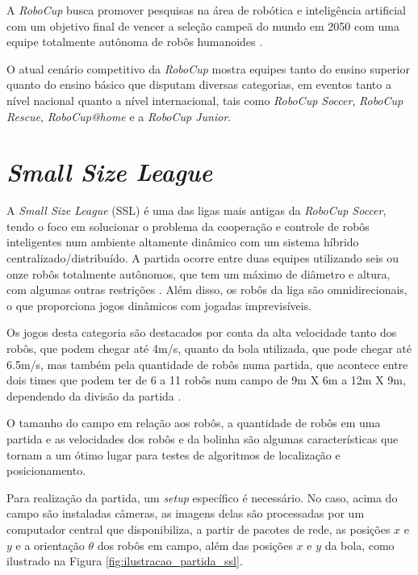 \documentclass[acronym, symbols, table]{fei}
\begin{document}
		A \textit{RoboCup} busca promover pesquisas na área de robótica e inteligência artificial com um objetivo final de vencer a seleção campeã do mundo em 2050 com uma equipe totalmente autônoma de robôs humanoides \cite{RoboCup}.
		
		O atual cenário competitivo da \textit{RoboCup} mostra equipes tanto do ensino superior quanto do ensino básico que disputam diversas categorias, em eventos tanto a nível nacional quanto a nível internacional, tais como \textit{RoboCup Soccer}, \textit{RoboCup Rescue}, \textit{RoboCup@home} e a \textit{RoboCup Junior}.
	
	\section{\textit{Small Size League}} \label{sec:small_size_league}
	
		A \textit{Small Size League} (SSL) é uma das ligas mais antigas da \textit{RoboCup Soccer}, tendo o foco em solucionar o problema da cooperação e controle de robôs inteligentes num ambiente altamente dinâmico com um sistema híbrido centralizado/distribuído. A partida ocorre entre duas equipes utilizando seis ou onze robôs totalmente autônomos, que tem um máximo de diâmetro e altura, com algumas outras restrições \cite{RoboCup}. Além disso, os robôs da liga são omnidirecionais, o que proporciona jogos dinâmicos com jogadas imprevisíveis.
		
		Os jogos desta categoria são destacados por conta da alta velocidade tanto dos robôs, que podem chegar até 4m/s, quanto da bola utilizada, que pode chegar até 6.5m/s, mas também pela quantidade de robôs numa partida, que acontece entre dois times que podem ter de 6 a 11 robôs num campo de 9m X 6m a 12m X 9m, dependendo da divisão da partida \cite{10332958}.
		
		O tamanho do campo em relação aos robôs, a quantidade de robôs em uma partida e as velocidades dos robôs e da bolinha são algumas características que tornam a  um ótimo lugar para testes de algoritmos de localização e posicionamento.
		
		Para realização da partida, um \textit{setup} específico é necessário. No caso, acima do campo são instaladas câmeras, as imagens delas são processadas por um computador central que disponibiliza, a partir de pacotes de rede, as posições $x$ e $y$ e a orientação $\theta$ dos robôs em campo, além das posições $x$ e $y$ da bola, como ilustrado na Figura \ref{fig:ilustracao_partida_ssl}.
		
\end{document}
